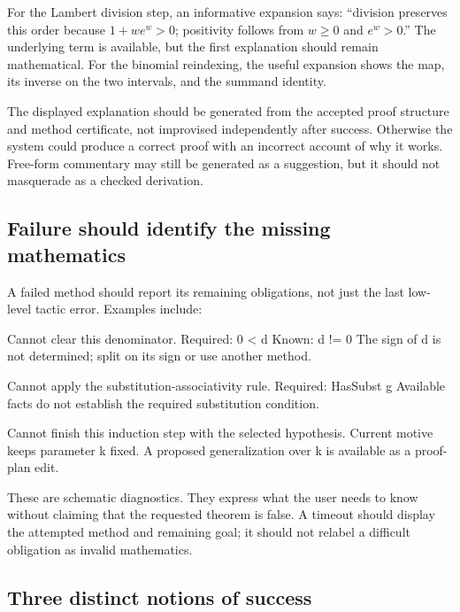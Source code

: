 \documentclass[11pt,a4paper]{article}
\begin{document}
For the Lambert division step, an informative expansion says: ``division preserves this order because $1+w e^w>0$; positivity follows from $w\ge0$ and $e^w>0$.'' The underlying term is available, but the first explanation should remain mathematical. For the binomial reindexing, the useful expansion shows the map, its inverse on the two intervals, and the summand identity.

The displayed explanation should be generated from the accepted proof structure and method certificate, not improvised independently after success. Otherwise the system could produce a correct proof with an incorrect account of why it works. Free-form commentary may still be generated as a suggestion, but it should not masquerade as a checked derivation.

\subsection{Failure should identify the missing mathematics}

A failed method should report its remaining obligations, not just the last low-level tactic error. Examples include:
\par\noindent\begin{minipage}{\linewidth}
\begin{rawcode}
Cannot clear this denominator.
Required: 0 < d
Known:    d != 0
The sign of d is not determined; split on its sign or use another method.

Cannot apply the substitution-associativity rule.
Required: HasSubst g
Available facts do not establish the required substitution condition.

Cannot finish this induction step with the selected hypothesis.
Current motive keeps parameter k fixed.
A proposed generalization over k is available as a proof-plan edit.
\end{rawcode}
\end{minipage}\par

These are schematic diagnostics. They express what the user needs to know without claiming that the requested theorem is false. A timeout should display the attempted method and remaining goal; it should not relabel a difficult obligation as invalid mathematics.

\subsection{Three distinct notions of success}
\end{document}
